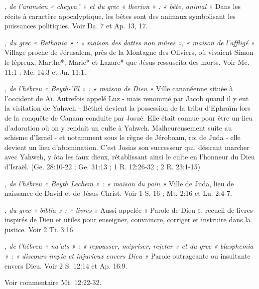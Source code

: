 \begin{multicols}{2}
\textit{, de l'araméen « cheyva´ » et du grec « therion » : « bête, animal »}\newline
Dans les récits à caractère apocalyptique, les bêtes sont des animaux symbolisant les puissances politiques. Voir Da. 7 et Ap. 13, 17.

\textit{, du grec « Bethania » : « maison des dattes non mûres », « maison de l'affligé »}\newline
Village proche de Jérusalem, près de la Montagne des Oliviers, où vivaient Simon le lépreux, Marthe*, Marie* et Lazare* que Jésus ressuscita des morts. Voir Mc. 11:1 ; Mc. 14:3 et Jn. 11:1.

\textit{, de l'hébreu « Beyth-'El » : « maison de Dieu »}\newline
Ville cananéenne située à l'occident de Aï. Autrefois appelé Luz - mais renommé par Jacob quand il y eut la visitation de Yahweh - Béthel devient la possession de la tribu d'Ephraïm lors de la conquête de Canaan conduite par Josué. Elle était connue pour être un lieu d'adoration où on y rendait un culte à Yahweh. Malheureusement suite au schisme d'Israël - et notamment sous le règne de Jéroboam, roi de Juda - elle devient un lieu d'abomination. C'est Josias son successeur qui, désirant marcher avec Yahweh, y ôta les faux dieux, rétablissant ainsi le culte en l'honneur du Dieu d'Israël. (Ge. 28:10-22 ; Ge. 31:13 ; 1 R. 12:26-32 ; 2 R. 23:1-15)

\textit{, de l'hébreu « Beyth Lechem » : « maison du pain »}\newline
Ville de Juda, lieu de naissance de David et de Jésus-Christ. Voir 1 S. 16 ; Mt. 2:16 et Lu. 2:4-7.

\textit{, du grec « biblia » : « livres »}\newline
Aussi appelée « Parole de Dieu », recueil de livres inspirés de Dieu et utiles pour enseigner, convaincre, corriger et instruire dans la justice. Voir 2 Ti. 3:16.

\textit{, de l'hébreu « na'ats » : « repousser, mépriser, rejeter » et du grec « blasphemia » : « discours impie et injurieux envers Dieu »}\newline
Parole outrageante ou insultante envers Dieu. Voir 2 S. 12:14 et Ap. 16:9.

\textit{}\newline
Voir commentaire Mt. 12:22-32.


\end{multicols}
